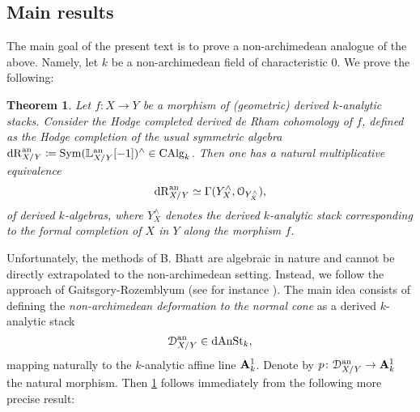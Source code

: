 \documentclass[10pt,a4paper,reqno]{amsart} %
\theoremstyle{plain}
\newtheorem{thm}{Theorem}[section]
\theoremstyle{definition}
\theoremstyle{remark}
\numberwithin{equation}{section}
\begin{document}

\subsection{Main results}
The main goal of the present text is to prove a non-archimedean analogue of the above. Namely, let $k$ be a non-archimedean field of characteristic $0$.
We prove the following:

\begin{thm} \label{intro-thm1}
    Let $f \colon X \to Y$ be a morphism of (geometric) derived $k$-analytic stacks. Consider
    the \emph{Hodge completed derived de Rham cohomology of $f$}, defined as the Hodge completion of the usual symmetric algebra $\mathrm{dR}_{X/ Y} ^\mathrm{an} \coloneqq \operatorname{Sym}(\mathbb L_{X/ Y} ^\mathrm{an}[-1])^\wedge \in \mathrm{CAlg}_k$.
    Then one has a natural multiplicative equivalence
        \[
            \mathrm{dR}_{X/ Y} ^\mathrm{an} \simeq \Gamma(Y^\wedge_X, \mathcal O_{Y^\wedge_X}),
        \]
    of derived $k$-algebras,
    where $Y^\wedge_X$ denotes the derived $k$-analytic stack corresponding to the formal completion of $X$ in $Y$ along the morphism $f$.
\end{thm}

Unfortunately, the methods of B. Bhatt are algebraic in nature and cannot be directly extrapolated to the non-archimedean setting. Instead, we follow the
approach of Gaitsgory-Rozemblyum (see for instance \cite[\S 9]{Gaitsgory_Study_II}). The main idea consists of defining the \emph{non-archimedean deformation
to the normal cone} as a derived $k$-analytic stack
    \[
        \mathcal D^\mathrm{an}_{X/ Y} \in \mathrm{dAnSt}_k,  
    \]
mapping naturally to the $k$-analytic affine line $\mathbf A^1_k$. Denote by $p \colon \mathcal D_{X/ Y}^\mathrm{an} \to \mathbf A^1_k$ the natural morphism. Then
\cref{intro-thm1} follows immediately from the following more precise result:
\end{document}
